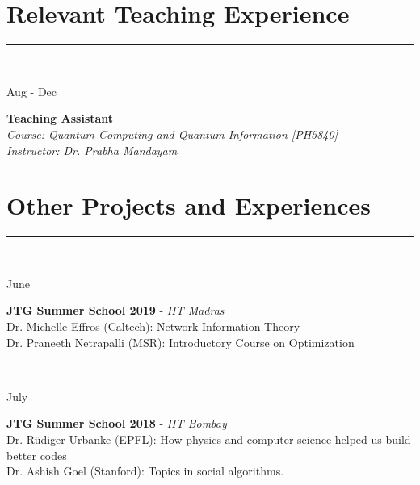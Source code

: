 \documentclass[10pt]{article}
\newcommand\vtick{\textquotesingle}
\begin{document}
\vspace{0.3cm}
\section*{\color{black} Relevant Teaching Experience}
\noindent\textcolor{black}{\rule{\textwidth}{1.5pt}} \vspace{-0.2cm}\\
\begin{minipage}[t]{.2\textwidth}
Aug\vtick18 - Dec\vtick18
\end{minipage}
\begin{minipage}[t]{0.8\textwidth}
{\bf Teaching Assistant} \\
{\it Course: Quantum Computing and Quantum Information [PH5840]}\\
{\it Instructor: Dr. Prabha Mandayam}
\end{minipage}

\vspace{0.3cm}
\section*{\color{black} Other Projects and Experiences}
\noindent\textcolor{black}{\rule{\textwidth}{1.5pt}} \vspace{-0.2cm}\\
\begin{minipage}[t]{.2\textwidth}
June\vtick19 
\end{minipage}
\begin{minipage}[t]{0.8\textwidth}
{\bf JTG Summer School 2019} - {\it IIT Madras} \\
Dr. Michelle Effros (Caltech): Network Information Theory \\
Dr. Praneeth Netrapalli (MSR): Introductory Course on Optimization
\end{minipage} \\

\noindent
\begin{minipage}[t]{.2\textwidth}
July\vtick18 
\end{minipage}
\begin{minipage}[t]{0.8\textwidth}
{\bf JTG Summer School 2018} - {\it IIT Bombay} \\
Dr. Rüdiger Urbanke (EPFL): How physics and computer science helped us build better codes \\
Dr. Ashish Goel (Stanford): Topics in social algorithms.
\end{minipage} \\
\end{document}
